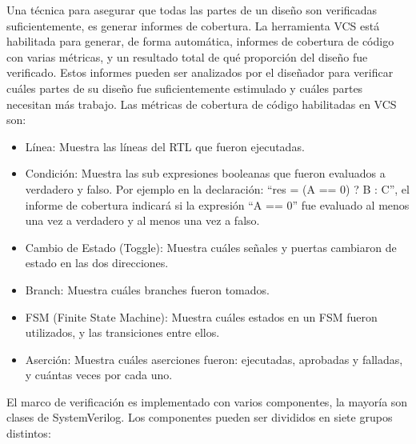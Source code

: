 \documentclass[a4paper, twoside, 11pt]{report}
\begin{document}
Una técnica para asegurar que todas las partes de un diseño son verificadas suficientemente, es generar informes de cobertura. La herramienta VCS está habilitada para generar, de forma automática, informes de cobertura de código con varias métricas, y un resultado total de qué proporción del diseño fue verificado. Estos informes pueden ser analizados por el diseñador para verificar cuáles partes de su diseño fue suficientemente estimulado y cuáles partes necesitan más trabajo. Las métricas de cobertura de código habilitadas en VCS son:

\begin{itemize}
  \item Línea: Muestra las líneas del RTL que fueron ejecutadas.
  \item Condición: Muestra las sub expresiones booleanas que fueron evaluados a verdadero y falso. Por ejemplo en la declaración: “res = (A == 0) ? B : C”, el informe de cobertura indicará si la expresión “A == 0” fue evaluado al menos una vez a verdadero y al menos una vez a falso.
  \item Cambio de Estado (Toggle): Muestra cuáles señales y puertas cambiaron de estado en las dos direcciones.
  \item Branch: Muestra cuáles branches fueron tomados.
  \item FSM (Finite State Machine): Muestra cuáles estados en un FSM fueron utilizados, y las transiciones entre ellos.
  \item Aserción: Muestra cuáles aserciones fueron: ejecutadas, aprobadas y falladas, y cuántas veces por cada uno.
\end{itemize}

El marco de verificación es implementado con varios componentes, la mayoría son clases de SystemVerilog. Los componentes pueden ser divididos en siete grupos distintos:
\end{document}
